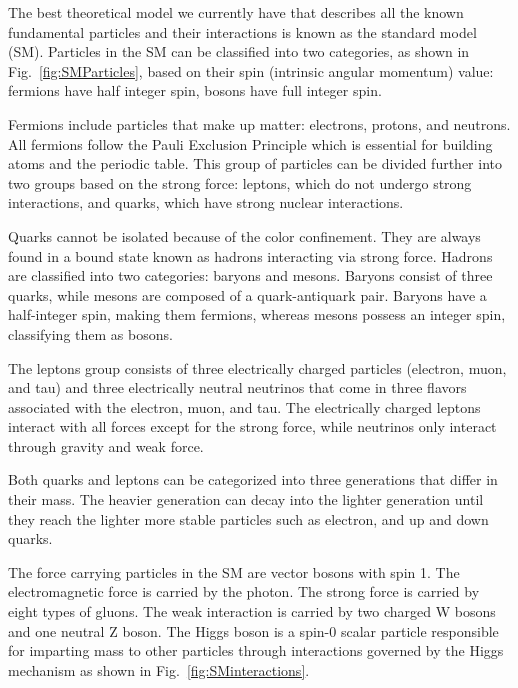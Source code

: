 
The best theoretical model we currently have that describes all the known fundamental particles and their interactions is known as the standard model (SM). Particles in the SM can be classified into two categories, as shown in Fig.~\ref{fig:SMParticles}, based on their spin (intrinsic angular momentum) value: fermions have half integer spin, bosons have full integer spin.

Fermions include particles that make up matter: electrons, protons, and neutrons. All fermions follow the Pauli Exclusion Principle which is essential for building atoms and the periodic table. This group of particles can be divided further into two groups based on the strong force: leptons, which do not undergo strong interactions, and quarks, which have strong nuclear interactions.

Quarks cannot be isolated because of the color confinement. They are always found in a bound state known as hadrons interacting via strong force.
Hadrons are classified into two categories: baryons and mesons.
Baryons consist of three quarks, while mesons are composed of a quark-antiquark pair.
Baryons have a half-integer spin, making them fermions, whereas mesons possess an integer spin, classifying them as bosons.

The leptons group consists of three electrically charged particles (electron, muon, and tau) and three electrically neutral neutrinos that come in three flavors associated with the electron, muon, and tau. The electrically charged leptons interact with all forces except for the strong force, while neutrinos only interact through gravity and weak force.

Both quarks and leptons can be categorized into
three generations that differ in their mass.
The heavier generation can decay into the lighter generation
until they reach the lighter more stable particles such as electron, and up and down quarks.

The force carrying particles in the SM are vector bosons with spin 1. The electromagnetic force is carried by the photon. The strong force is carried by eight types of gluons. The weak interaction is carried by two charged W bosons and one neutral Z boson.
The Higgs boson is a spin-0 scalar particle responsible for imparting mass to other particles through interactions governed by the Higgs mechanism as shown in Fig.~\ref{fig:SMinteractions}.

